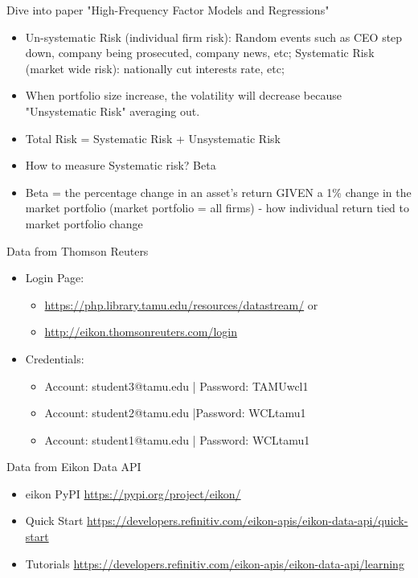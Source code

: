 \begin{enumerate}
    \item{Dive into paper "High-Frequency Factor Models and Regressions" 
        \begin{itemize}
         \item Un-systematic Risk (individual firm risk): Random events such as CEO step down, company being prosecuted, company news, etc; Systematic Risk (market wide risk): nationally cut interests rate, etc; 
         \item When portfolio size increase, the volatility will decrease because "Unsystematic Risk" averaging out.
         \item Total Risk = Systematic Risk + Unsystematic Risk
         \item How to measure Systematic risk? Beta
         \item Beta = the percentage change in an asset's return GIVEN a 1\% change in the market portfolio (market portfolio = all firms) - how individual return tied to market portfolio change
        \end{itemize}
        
    \item{Data from Thomson Reuters}
        \begin{itemize}
            \item Login Page:
                \begin{itemize}
                    \item  \url{https://php.library.tamu.edu/resources/datastream/} or 
                    \item  \url{http://eikon.thomsonreuters.com/login}
                \end{itemize}
            \item Credentials: 
                \begin{itemize}
                    \item   Account: student3@tamu.edu  | Password: TAMUwcl1
                    \item   Account: student2@tamu.edu  |Password: WCLtamu1
                    \item   Account: student1@tamu.edu  | Password: WCLtamu1
                \end{itemize}

        \end{itemize}
    
      \item{Data from Eikon Data API}
        \begin{itemize} 
           \item eikon PyPI  \url{https://pypi.org/project/eikon/}
           \item Quick Start  \url{https://developers.refinitiv.com/eikon-apis/eikon-data-api/quick-start}
           \item Tutorials
           \url{https://developers.refinitiv.com/eikon-apis/eikon-data-api/learning}
        \end{itemize}
        
}
\end{enumerate}
